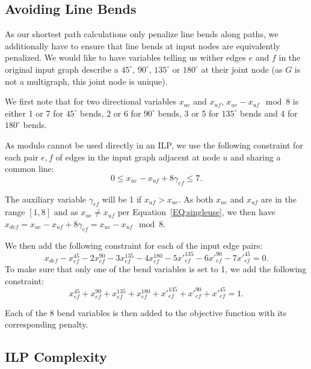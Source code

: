 \documentclass{sig-alternate-sigmod09}
\begin{document}
\subsection{Avoiding Line Bends}

As our shortest path calculations only penalize line bends along paths, we additionally have to ensure that line bends at input nodes are equivalently penalized.
We would like to have variables telling us wither edges $e$ and $f$ in the original input graph describe a $45^{\circ}$, $90^{\circ}$, $135^{\circ}$ or $180^{\circ}$ at their joint node (as $G$ is not a multigraph, this joint node is unique).

We first note that for two directional variables $x_{ue}$ and $x_{uf}$, $x_{ue} - x_{uf} \mod 8$ is either 1 or 7 for $45^\circ$ bends, 2 or 6 for $90^\circ$ bends, 3 or 5 for $135^\circ$ bends and 4 for $180^\circ$ bends.

As modulo cannot be used directly in an ILP, we use the following constraint for each pair $e, f$ of edges in the input graph adjacent at node $u$ and sharing a common line:
\begin{equation} 
  0 \leq x_{ue} - x_{uf} + 8 \gamma_{ef} \leq 7.
\end{equation}

The auxiliary variable $\gamma_{ef}$ will be 1 if $x_{uf} > x_{ue}$. As both $x_{ue}$ and $x_{uf}$ are in the range $[1, 8]$ and as $x_{ue} \neq x_{uf}$ per Equation~\ref{EQ:singleuse}, we then have $x_{def} = x_{ue} - x_{uf} + 8 \gamma_{ef} = x_{ue} - x_{uf} \mod 8$.

We then add the following constraint for each of the input edge pairs:
%
\begin{equation} 
  x_{def} - x_{ef}^{45} - 2x_{ef}^{90} - 3x_{ef}^{135} - 4x_{ef}^{180} - 5 {x'}_{ef}^{135} - 6{x'}_{ef}^{90} - 7{x'}_{ef}^{45} = 0.
\end{equation}
%
To make sure that only one of the bend variables is set to 1, we add the following constraint:
%
\begin{equation} 
  x_{ef}^{45} + x_{ef}^{90} + x_{ef}^{135} + x_{ef}^{180} + {x'}_{ef}^{135} + {x'}_{ef}^{90} + {x'}_{ef}^{45} = 1.
\end{equation}

Each of the 8 bend variables is then added to the objective function with its corresponding penalty.

\subsection{ILP Complexity}
\end{document}
